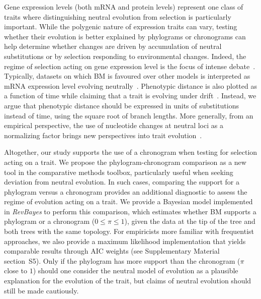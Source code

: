 \documentclass{article}
\newcommand{\PhyloSupport}{\pi}
\begin{document}
Gene expression levels (both mRNA and protein levels) represent one class of traits where distinguishing neutral evolution from selection is particularly important.
While the polygenic nature of expression traits can vary, testing whether their evolution is better explained by phylograms or chronograms can help determine whether changes are driven by accumulation of neutral substitutions or by selection responding to environmental changes.
Indeed, the regime of selection acting on gene expression level is the focus of intense debate~\citep{signor_evolution_2018, price_detecting_2022, bertram_cagee_2023, dimayacyac_evaluating_2023}.
Typically, datasets on which BM is favoured over other models is interpreted as mRNA expression level evolving neutrally~\citep{khaitovich_evolution_2006, catalan_drift_2019, dimayacyac_evaluating_2023}.
Phenotypic distance is also plotted as a function of time while claiming that a trait is evolving under drift~\citep{jiang_decoupling_2023}.
Instead, we argue that phenotypic distance should be expressed in units of substitutions instead of time, using the square root of branch lengths.
More generally, from an empirical perspective, the use of nucleotide changes at neutral loci as a normalizing factor brings new perspectives into trait evolution~\citep{latrille_detecting_2024}.

Altogether, our study supports the use of a chronogram when testing for selection acting on a trait.
We propose the phylogram-chronogram comparison as a new tool in the comparative methods toolbox, particularly useful when seeking deviation from neutral evolution.
In such cases, comparing the support for a phylogram versus a chronogram provides an additional diagnostic to assess the regime of evolution acting on a trait.
We provide a Bayesian model implemented in \textit{RevBayes} to perform this comparison, which estimates whether BM supports a phylogram or a chronogram ($0 \leq \PhyloSupport \leq 1$), given the data at the tip of the tree and both trees with the same topology.
For empiricists more familiar with frequentist approaches, we also provide a maximum likelihood implementation that yields comparable results through AIC weights (see Supplementary Material section~S5).
Only if the phylogram has more support than the chronogram ($\PhyloSupport$ close to $1$) should one consider the neutral model of evolution as a plausible explanation for the evolution of the trait, but claims of neutral evolution should still be made cautiously.
\end{document}
